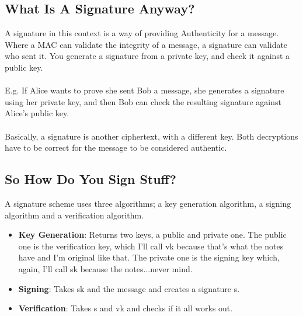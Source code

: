 	\subsection{What Is A Signature Anyway?}
	A signature in this context is a way of providing Authenticity for a message. Where a MAC can validate the integrity of a message, a signature can validate who sent it. You generate a signature from a private key, and check it against a public key.\\
	\\
	E.g. If Alice wants to prove she sent Bob a message, she generates a signature using her private key, and then Bob can check the resulting signature against Alice's public key.\\
	\\
	Basically, a signature is another ciphertext, with a different key. %
	Both decryptions have to be correct for the message to be considered authentic.

	\subsection{So How Do You Sign Stuff?}
	A signature scheme uses three algorithms; a key generation algorithm, a signing algorithm and a verification algorithm.
	\begin{itemize}
	\item \textbf{Key Generation}: Returns two keys, a public and private one. The public one is the \textcolor{B}{verification key}, which I'll call \textcolor{B}{vk} because that's what the notes have and I'm original like that. The private one is the \textcolor{R}{signing key} which, again, I'll call \textcolor{R}{sk} because the notes...never mind.
	\item \textbf{Signing}: Takes \textcolor{R}{sk} and the message and creates a signature \textcolor{B}{s}.
	\item \textbf{Verification}: Takes \textcolor{B}{s} and \textcolor{B}{vk} and checks if it all works out.
	\end{itemize}

